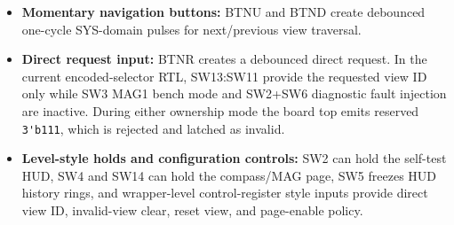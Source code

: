 \documentclass{article}
\newcommand{\sig}[1]{\begingroup\nolinkurl{#1}\endgroup}
\begin{document}
\begin{itemize}
  \item \textbf{Momentary navigation buttons:} BTNU and BTND create debounced
        one-cycle SYS-domain pulses for next/previous view traversal.
  \item \textbf{Direct request input:} BTNR creates a debounced direct request.
        In the current encoded-selector RTL, SW13:SW11 provide the requested
        view ID only while SW3 MAG1 bench mode and SW2+SW6 diagnostic fault
        injection are inactive.  During either ownership mode the board top
        emits reserved \sig{3'b111}, which is rejected and latched as invalid.
  \item \textbf{Level-style holds and configuration controls:} SW2 can hold the
        self-test HUD, SW4 and SW14 can hold the compass/MAG page, SW5 freezes
        HUD history rings, and wrapper-level control-register style inputs
        provide direct view ID, invalid-view clear, reset view, and page-enable
        policy.
\end{itemize}
\end{document}
